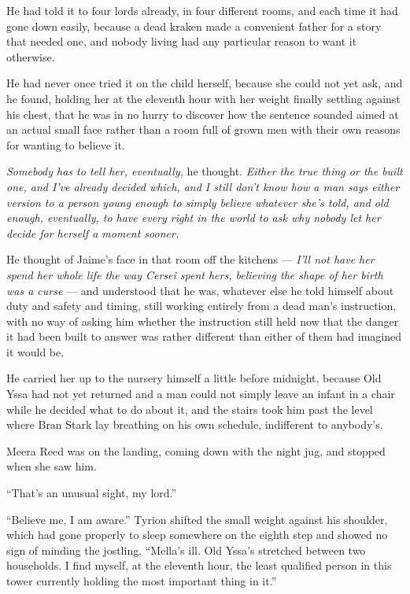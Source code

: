 He had told it to four lords already, in four different rooms, and each time it had gone down easily, because a dead kraken made a convenient father for a story that needed one, and nobody living had any particular reason to want it otherwise.

He had never once tried it on the child herself, because she could not yet ask, and he found, holding her at the eleventh hour with her weight finally settling against his chest, that he was in no hurry to discover how the sentence sounded aimed at an actual small face rather than a room full of grown men with their own reasons for wanting to believe it.

\textit{Somebody has to tell her, eventually,} he thought. \textit{Either the true thing or the built one, and I’ve already decided which, and I still don’t know how a man says either version to a person young enough to simply believe whatever she’s told, and old enough, eventually, to have every right in the world to ask why nobody let her decide for herself a moment sooner.}

He thought of Jaime’s face in that room off the kitchens — \textit{I’ll not have her spend her whole life the way Cersei spent hers, believing the shape of her birth was a curse} — and understood that he was, whatever else he told himself about duty and safety and timing, still working entirely from a dead man’s instruction, with no way of asking him whether the instruction still held now that the danger it had been built to answer was rather different than either of them had imagined it would be.

\sceneBreak

He carried her up to the nursery himself a little before midnight, because Old Yssa had not yet returned and a man could not simply leave an infant in a chair while he decided what to do about it, and the stairs took him past the level where Bran Stark lay breathing on his own schedule, indifferent to anybody’s.

Meera Reed was on the landing, coming down with the night jug, and stopped when she saw him.

“That’s an unusual sight, my lord.”

“Believe me, I am aware.” Tyrion shifted the small weight against his shoulder, which had gone properly to sleep somewhere on the eighth step and showed no sign of minding the jostling. “Mella’s ill. Old Yssa’s stretched between two households. I find myself, at the eleventh hour, the least qualified person in this tower currently holding the most important thing in it.”


